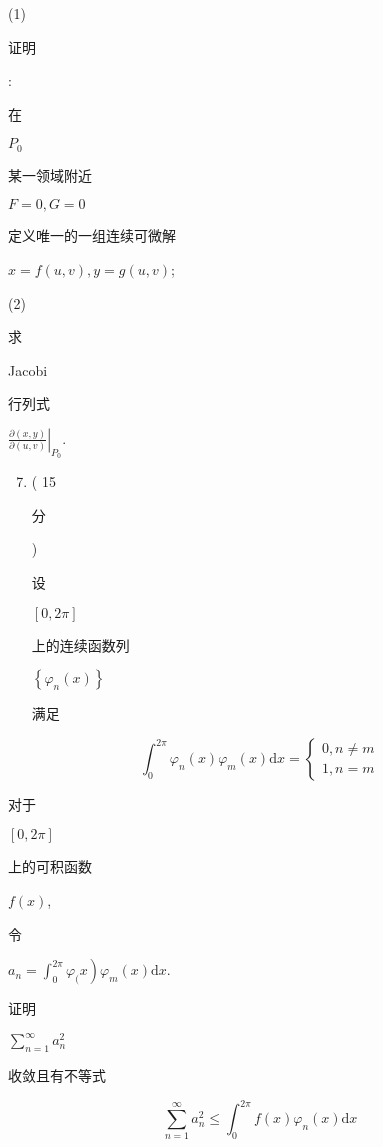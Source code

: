 \documentclass[10pt]{article}
\begin{document}
(1) \begin{CJK}{UTF8}{mj}证明\end{CJK}: \begin{CJK}{UTF8}{mj}在\end{CJK} $P_{0}$ \begin{CJK}{UTF8}{mj}某一领域附近\end{CJK} $F=0, G=0$ \begin{CJK}{UTF8}{mj}定义唯一的一组连续可微解\end{CJK} $x=f(u, v), y=g(u, v)$;

(2) \begin{CJK}{UTF8}{mj}求\end{CJK} Jacobi \begin{CJK}{UTF8}{mj}行列式\end{CJK} $\left.\frac{\partial(x, y)}{\partial(u, v)}\right|_{P_{0}}$.

\begin{enumerate}
  \setcounter{enumi}{6}
  \item ( 15 \begin{CJK}{UTF8}{mj}分\end{CJK}) \begin{CJK}{UTF8}{mj}设\end{CJK} $[0,2 \pi]$ \begin{CJK}{UTF8}{mj}上的连续函数列\end{CJK} $\left\{\varphi_{n}(x)\right\}$ \begin{CJK}{UTF8}{mj}满足\end{CJK}
\end{enumerate}
$$
\int_{0}^{2 \pi} \varphi_{n}(x) \varphi_{m}(x) \mathrm{d} x=\left\{\begin{array}{l}
0, n \neq m \\
1, n=m
\end{array}\right.
$$
\begin{CJK}{UTF8}{mj}对于\end{CJK} $[0,2 \pi]$ \begin{CJK}{UTF8}{mj}上的可积函数\end{CJK} $f(x)$, \begin{CJK}{UTF8}{mj}令\end{CJK} $\left.a_{n}=\int_{0}^{2 \pi} \varphi_{(} x\right) \varphi_{m}(x) \mathrm{d} x$. \begin{CJK}{UTF8}{mj}证明\end{CJK} $\sum_{n=1}^{\infty} a_{n}^{2}$ \begin{CJK}{UTF8}{mj}收敛且有不等式\end{CJK}
$$
\sum_{n=1}^{\infty} a_{n}^{2} \leqslant \int_{0}^{2 \pi} f(x) \varphi_{n}(x) \mathrm{d} x
$$
\end{document}
